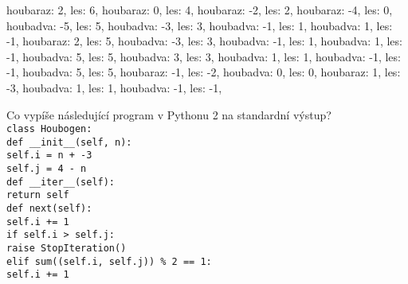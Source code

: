\documentclass[addpoints,12pt]{exam}
\begin{document}
\begin{questions}
\nopagebreak
\begin{choices}
\choice
houbaraz: 2, les: 6, houbaraz: 0, les: 4, houbaraz: -2, les: 2, houbaraz: -4, les: 0,
\choice
houbadva: -5, les: 5, houbadva: -3, les: 3, houbadva: -1, les: 1, houbadva: 1, les: -1,
\choice
houbaraz: 2, les: 5, houbadva: -3, les: 3, houbadva: -1, les: 1, houbadva: 1, les: -1,
\choice
houbadva: 5, les: 5, houbadva: 3, les: 3, houbadva: 1, les: 1, houbadva: -1, les: -1,
\choice
houbadva: 5, les: 5, houbaraz: -1, les: -2, houbadva: 0, les: 0,
\choice
houbaraz: 1, les: -3, houbadva: 1, les: 1, houbadva: -1, les: -1,
\end{choices}
\question[2]
Co vypíše následující program v Pythonu 2 na standardní výstup?\\
\texttt{class Houbogen:\\
\hspace*{0.6cm}def \_{}\_{}init\_{}\_{}(self, n):\\
\hspace*{0.6cm}\hspace*{0.6cm}self.i = n + -3\\
\hspace*{0.6cm}\hspace*{0.6cm}self.j = 4 - n\\
\hspace*{0.6cm}def \_{}\_{}iter\_{}\_{}(self):\\
\hspace*{0.6cm}\hspace*{0.6cm}return self\\
\hspace*{0.6cm}def next(self):\\
\hspace*{0.6cm}\hspace*{0.6cm}self.i += 1\\
\hspace*{0.6cm}\hspace*{0.6cm}if self.i \textgreater{} self.j:\\
\hspace*{0.6cm}\hspace*{0.6cm}\hspace*{0.6cm}raise StopIteration()\\
\hspace*{0.6cm}\hspace*{0.6cm}elif sum((self.i, self.j)) \%{} 2 == 1:\\
\hspace*{0.6cm}\hspace*{0.6cm}\hspace*{0.6cm}self.i += 1\\
}
\end{questions}
\end{document}
